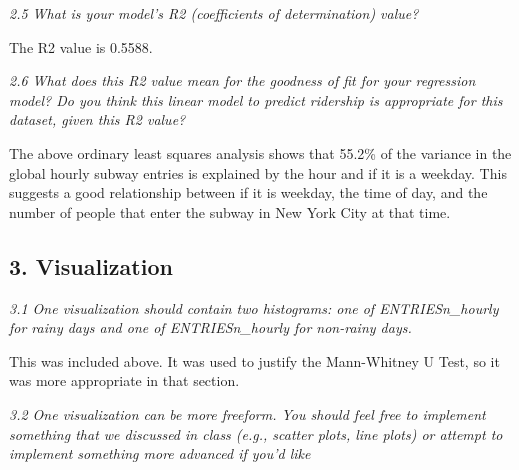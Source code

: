 \documentclass{article}
\begin{document}
\emph{2.5 What is your model's R2 (coefficients of determination)
value?}

The R2 value is 0.5588.

\emph{2.6 What does this R2 value mean for the goodness of fit for your
regression model? Do you think this linear model to predict ridership is
appropriate for this dataset, given this R2 value?}

The above ordinary least squares analysis shows that 55.2\% of the
variance in the global hourly subway entries is explained by the hour
and if it is a weekday. This suggests a good relationship between if it
is weekday, the time of day, and the number of people that enter the
subway in New York City at that time.

    \subsection*{3. Visualization}\label{visualization}

    \emph{3.1 One visualization should contain two histograms: one of
ENTRIESn\_hourly for rainy days and one of ENTRIESn\_hourly for
non-rainy days.}

This was included above. It was used to justify the Mann-Whitney U Test,
so it was more appropriate in that section.

    \emph{3.2 One visualization can be more freeform. You should feel free
to implement something that we discussed in class (e.g., scatter plots,
line plots) or attempt to implement something more advanced if you'd
like}
\end{document}
